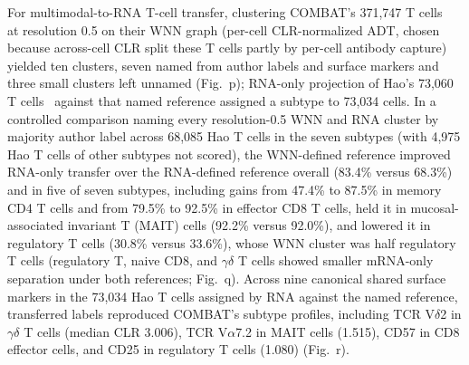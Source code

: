 For multimodal-to-RNA T-cell transfer, clustering COMBAT's 371,747 T cells~\cite{combat2022blood} at resolution 0.5 on their WNN graph (per-cell CLR-normalized ADT, chosen because across-cell CLR split these T cells partly by per-cell antibody capture) yielded ten clusters, seven named from author labels and surface markers and three small clusters left unnamed (Fig.~p); RNA-only projection of Hao's 73,060 T cells~\cite{hao2021} against that named reference assigned a subtype to 73,034 cells. In a controlled comparison naming every resolution-0.5 WNN and RNA cluster by majority author label across 68,085 Hao T cells in the seven subtypes (with 4,975 Hao T cells of other subtypes not scored), the WNN-defined reference improved RNA-only transfer over the RNA-defined reference overall (83.4\% versus 68.3\%) and in five of seven subtypes, including gains from 47.4\% to 87.5\% in memory CD4 T cells and from 79.5\% to 92.5\% in effector CD8 T cells, held it in mucosal-associated invariant T (MAIT) cells (92.2\% versus 92.0\%), and lowered it in regulatory T cells (30.8\% versus 33.6\%), whose WNN cluster was half regulatory T cells (regulatory T, naive CD8, and \ensuremath{\gamma}\ensuremath{\delta} T cells showed smaller mRNA-only separation under both references; Fig.~q). Across nine canonical shared surface markers in the 73,034 Hao T cells assigned by RNA against the named reference, transferred labels reproduced COMBAT's subtype profiles, including TCR V\ensuremath{\delta}2 in \ensuremath{\gamma}\ensuremath{\delta} T cells (median CLR 3.006), TCR V\ensuremath{\alpha}7.2 in MAIT cells (1.515), CD57 in CD8 effector cells, and CD25 in regulatory T cells (1.080) (Fig.~r).
